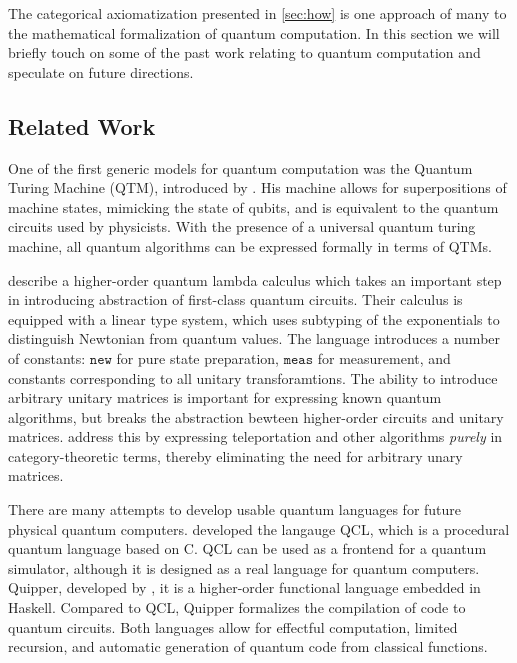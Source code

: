 The categorical axiomatization presented in \cref{sec:how} is one approach of many
to the mathematical formalization of quantum computation. In this section
we will briefly touch on some of the past work relating to quantum computation
and speculate on future directions.

\subsection{Related Work} 

One of the first generic models for quantum computation was the Quantum
Turing Machine (QTM), introduced by \citet{deutsch1985}. His machine allows for superpositions
of machine states, mimicking the state of qubits, and is equivalent to the
quantum circuits used by physicists. With the presence of a universal quantum turing
machine, all quantum algorithms can be expressed formally in terms of QTMs. 

 describe a higher-order quantum lambda 
calculus which  takes an important step in introducing abstraction of first-class 
quantum circuits.
Their calculus is equipped with a linear type system, which uses subtyping of the
exponentials to distinguish Newtonian from quantum values. The language introduces
a number of constants: $\texttt{new}$ for pure state preparation,
$\texttt{meas}$ for measurement, and constants corresponding to all unitary
transforamtions. The ability to introduce arbitrary unitary matrices is
important for expressing known quantum algorithms, but breaks the abstraction 
bewteen higher-order circuits and unitary matrices. \citet{abramsky2009categorical}
address this by expressing teleportation and other algorithms \emph{purely} in
category-theoretic terms, thereby eliminating the need for arbitrary unary matrices.

There are many attempts to develop usable quantum languages for future physical quantum
computers. \citet{omer2000quantum} developed the langauge QCL, which is a procedural
quantum language based on C\@. QCL can be used as a frontend for a quantum simulator,
although it is designed as a real language for quantum computers. Quipper,
developed by \citet{green13quipper}, 
it is a higher-order functional language embedded in Haskell. Compared to QCL,
Quipper formalizes the compilation of code to quantum circuits.
Both languages allow for effectful computation, limited recursion, and automatic
generation of quantum code from classical functions.

